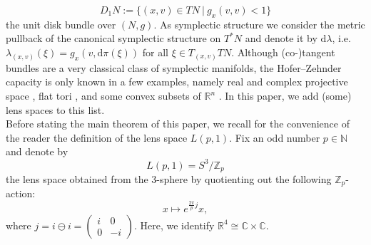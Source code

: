 \documentclass[12pt]{article}
\newcommand{\dd}{\mathrm{d}}
\begin{document}
$$
D_1N:=\lbrace (x,v)\in TN\ \vert \ g_x(v,v)<1\rbrace
$$
the unit disk bundle over $(N,g)$. As symplectic structure we consider the metric pullback of the canonical symplectic structure on $T^*N$ and denote it by $\dd\lambda$, i.e.\ $\lambda_{(x,v)}(\xi)=g_x(v,\dd\pi (\xi))$ for all $\xi\in T_{(x,v)}TN$. Although (co-)tangent bundles are a very classical class of symplectic manifolds, the Hofer--Zehnder capacity is only known in a few examples, namely real and complex projective space \cite{B23}, flat tori \cite{BBZ23}, and some convex subsets of \( \mathbb{R}^n \) \cite{AKO14}. In this paper, we add (some) lens spaces to this list. \\
Before stating the main theorem of this paper, we recall for the convenience of the reader the definition of the lens space \( L(p,1) \). Fix an odd number \( p \in \mathbb{N} \) and denote by  
\begin{equation}\label{e: defi lens space}
    L(p,1) = S^3 / \mathbb{Z}_p
\end{equation}
the lens space obtained from the 3-sphere by quotienting out the following \( \mathbb{Z}_p \)-action:  
\[
x \mapsto e^{\frac{2\pi}{p} j} x,
\]
where  $j = i \ominus i = \begin{pmatrix} i & 0 \\ 0 & -i \end{pmatrix}$. Here, we identify \( \mathbb{R}^4 \cong \mathbb{C} \times \mathbb{C} \).
\end{document}
